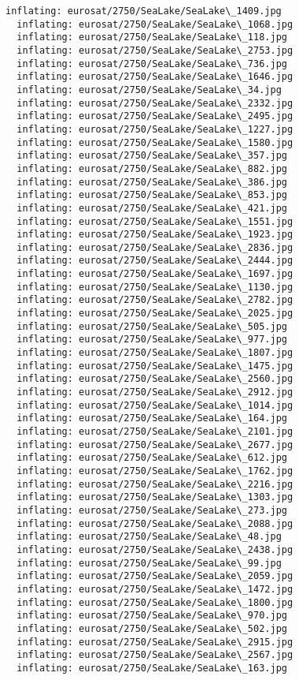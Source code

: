 \documentclass[11pt]{article}
\begin{document}
\begin{Verbatim}[commandchars=\\\{\}]
  inflating: eurosat/2750/SeaLake/SeaLake\_1409.jpg
  inflating: eurosat/2750/SeaLake/SeaLake\_1068.jpg
  inflating: eurosat/2750/SeaLake/SeaLake\_118.jpg
  inflating: eurosat/2750/SeaLake/SeaLake\_2753.jpg
  inflating: eurosat/2750/SeaLake/SeaLake\_736.jpg
  inflating: eurosat/2750/SeaLake/SeaLake\_1646.jpg
  inflating: eurosat/2750/SeaLake/SeaLake\_34.jpg
  inflating: eurosat/2750/SeaLake/SeaLake\_2332.jpg
  inflating: eurosat/2750/SeaLake/SeaLake\_2495.jpg
  inflating: eurosat/2750/SeaLake/SeaLake\_1227.jpg
  inflating: eurosat/2750/SeaLake/SeaLake\_1580.jpg
  inflating: eurosat/2750/SeaLake/SeaLake\_357.jpg
  inflating: eurosat/2750/SeaLake/SeaLake\_882.jpg
  inflating: eurosat/2750/SeaLake/SeaLake\_386.jpg
  inflating: eurosat/2750/SeaLake/SeaLake\_853.jpg
  inflating: eurosat/2750/SeaLake/SeaLake\_421.jpg
  inflating: eurosat/2750/SeaLake/SeaLake\_1551.jpg
  inflating: eurosat/2750/SeaLake/SeaLake\_1923.jpg
  inflating: eurosat/2750/SeaLake/SeaLake\_2836.jpg
  inflating: eurosat/2750/SeaLake/SeaLake\_2444.jpg
  inflating: eurosat/2750/SeaLake/SeaLake\_1697.jpg
  inflating: eurosat/2750/SeaLake/SeaLake\_1130.jpg
  inflating: eurosat/2750/SeaLake/SeaLake\_2782.jpg
  inflating: eurosat/2750/SeaLake/SeaLake\_2025.jpg
  inflating: eurosat/2750/SeaLake/SeaLake\_505.jpg
  inflating: eurosat/2750/SeaLake/SeaLake\_977.jpg
  inflating: eurosat/2750/SeaLake/SeaLake\_1807.jpg
  inflating: eurosat/2750/SeaLake/SeaLake\_1475.jpg
  inflating: eurosat/2750/SeaLake/SeaLake\_2560.jpg
  inflating: eurosat/2750/SeaLake/SeaLake\_2912.jpg
  inflating: eurosat/2750/SeaLake/SeaLake\_1014.jpg
  inflating: eurosat/2750/SeaLake/SeaLake\_164.jpg
  inflating: eurosat/2750/SeaLake/SeaLake\_2101.jpg
  inflating: eurosat/2750/SeaLake/SeaLake\_2677.jpg
  inflating: eurosat/2750/SeaLake/SeaLake\_612.jpg
  inflating: eurosat/2750/SeaLake/SeaLake\_1762.jpg
  inflating: eurosat/2750/SeaLake/SeaLake\_2216.jpg
  inflating: eurosat/2750/SeaLake/SeaLake\_1303.jpg
  inflating: eurosat/2750/SeaLake/SeaLake\_273.jpg
  inflating: eurosat/2750/SeaLake/SeaLake\_2088.jpg
  inflating: eurosat/2750/SeaLake/SeaLake\_48.jpg
  inflating: eurosat/2750/SeaLake/SeaLake\_2438.jpg
  inflating: eurosat/2750/SeaLake/SeaLake\_99.jpg
  inflating: eurosat/2750/SeaLake/SeaLake\_2059.jpg
  inflating: eurosat/2750/SeaLake/SeaLake\_1472.jpg
  inflating: eurosat/2750/SeaLake/SeaLake\_1800.jpg
  inflating: eurosat/2750/SeaLake/SeaLake\_970.jpg
  inflating: eurosat/2750/SeaLake/SeaLake\_502.jpg
  inflating: eurosat/2750/SeaLake/SeaLake\_2915.jpg
  inflating: eurosat/2750/SeaLake/SeaLake\_2567.jpg
  inflating: eurosat/2750/SeaLake/SeaLake\_163.jpg

\end{Verbatim}
\end{document}
